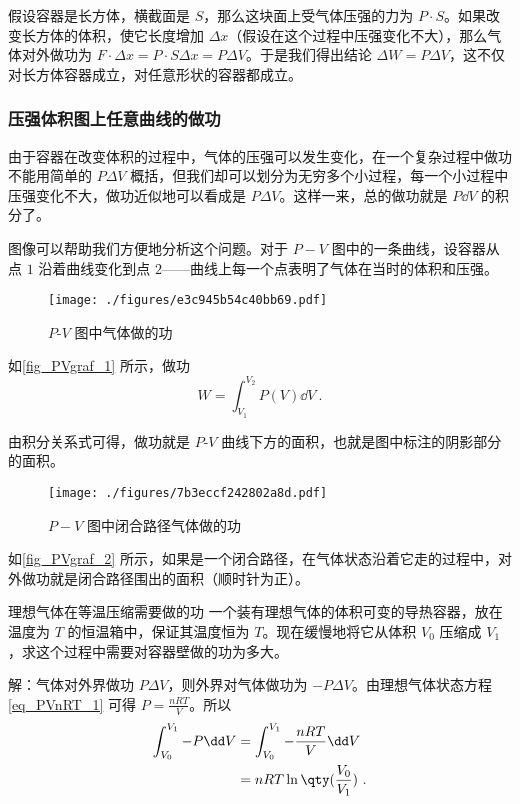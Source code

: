 假设容器是长方体，横截面是 $S$，那么这块面上受气体压强的力为 $P\cdot S$。如果改变长方体的体积，使它长度增加 $\Delta x$（假设在这个过程中压强变化不大），那么气体对外做功为 $F\cdot \Delta x=P\cdot S\Delta x=P\Delta V$。于是我们得出结论 $\Delta W=P\Delta V$，这不仅对长方体容器成立，对任意形状的容器都成立。
\subsubsection{压强体积图上任意曲线的做功}
由于容器在改变体积的过程中，气体的压强可以发生变化，在一个复杂过程中做功不能用简单的 $P\Delta V$ 概括，但我们却可以划分为无穷多个小过程，每一个小过程中压强变化不大，做功近似地可以看成是 $P\Delta V$。这样一来，总的做功就是 $P\dd V$ 的积分了。

图像可以帮助我们方便地分析这个问题。对于 $P-V$ 图中的一条曲线，设容器从点 $1$ 沿着曲线变化到点 $2$——曲线上每一个点表明了气体在当时的体积和压强。
\begin{figure}[ht]
\centering
\texttt{[image: ./figures/e3c945b54c40bb69.pdf]}
\caption{$P$-$V$ 图中气体做的功} \label{fig_PVgraf_1}
\end{figure}

如\autoref{fig_PVgraf_1} 所示，做功
\begin{equation}\label{eq_PVgraf_1}
W = \int_{V_1}^{V_2}P(V) \dd{V}~.
\end{equation}

由积分关系式可得，做功就是 $P$-$V$ 曲线下方的面积，也就是图中标注的阴影部分的面积。 

\begin{figure}[ht]  
\centering
\texttt{[image: ./figures/7b3eccf242802a8d.pdf]}
\caption{$P-V$ 图中闭合路径气体做的功} \label{fig_PVgraf_2}
\end{figure}

如\autoref{fig_PVgraf_2} 所示，如果是一个闭合路径，在气体状态沿着它走的过程中，对外做功就是闭合路径围出的面积（顺时针为正）。

\begin{example}{理想气体在等温压缩需要做的功}
一个装有理想气体的体积可变的导热容器，放在温度为 $T$ 的恒温箱中，保证其温度恒为 $T$。现在缓慢地将它从体积 $V_0$ 压缩成 $V_1$，求这个过程中需要对容器壁做的功为多大。

解：气体对外界做功 $P\Delta V$，则外界对气体做功为 $-P\Delta V$。由理想气体状态方程\autoref{eq_PVnRT_1} 可得 $P=\frac{nRT}{V}$。所以
\begin{equation}
\begin{aligned}
\int_{V_0}^{V_1} -P\dd V&=\int_{V_0}^{V_1} -\frac{nRT}{V} \dd V \\
&=nRT \ln\qty(\frac{V_0}{V_1})~.
\end{aligned}
\end{equation}
\end{example}
